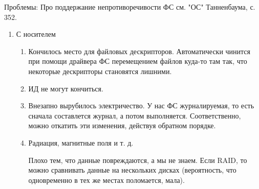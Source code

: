 \documentclass[a4paper,10pt]{article}
\begin{document}
Проблемы:
Про поддержание непротиворечивости ФС см. "ОС" Танненбаума, с. 352.
\begin{enumerate}
 \item С носителем
\begin{enumerate}
 \item Кончилось место для файловых дескрипторов. Автоматически чинится при помощи драйвера ФС перемещением файлов куда-то там так, что некоторые дескрипторы становятся лишними. 
 \item ИД не могут кончиться.
 \item Внезапно вырубилось электричество.
 У нас ФС журналируемая, то есть сначала составлется журнал, а потом выполняется. Соответственно, можно откатить эти изменения, действуя  обратном порядке.
 \item Радиация, магнитные поля и т. д.
 
 Плохо тем, что данные повреждаются, а мы не знаем. Если RAID, то можно сравнивать данные на нескольких дисках (вероятность, что одновременно в тех же местах поломается, мала).
 

\end{enumerate}
\end{enumerate}
\end{document}
